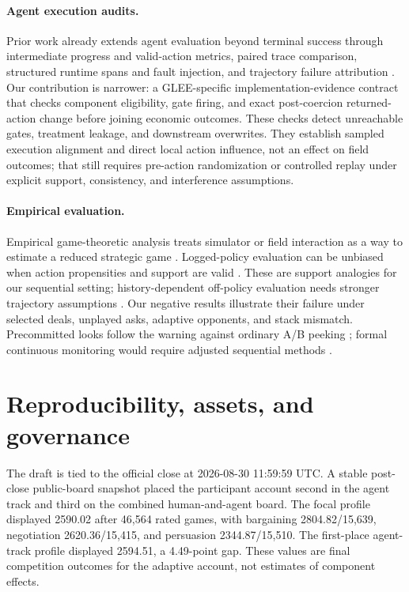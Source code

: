 \paragraph{Agent execution audits.}
Prior work already extends agent evaluation beyond terminal success through
intermediate progress and valid-action metrics, paired trace comparison,
structured runtime spans and fault injection, and trajectory failure
attribution
\citep{ma2024agentboard,zhou2026cta,seyedghorban2026observability,
zhang2025agentracer,chen2026trajectory}. Our contribution is narrower: a
GLEE-specific implementation-evidence contract that checks component
eligibility, gate firing, and exact post-coercion returned-action change before
joining economic outcomes. These checks detect unreachable gates, treatment
leakage, and downstream overwrites. They establish sampled execution alignment
and direct local action influence, not an effect on field outcomes; that still
requires pre-action randomization or controlled replay under explicit support,
consistency, and interference assumptions.

\paragraph{Empirical evaluation.}
Empirical game-theoretic analysis treats simulator or field interaction as a
way to estimate a reduced strategic game \citep{wellman2025egta}. Logged-policy
evaluation can be unbiased when action propensities and support are valid
\citep{li2011offline,dudik2014doubly}. These are support analogies for our
sequential setting; history-dependent off-policy evaluation needs stronger
trajectory assumptions \citep{jiang2016doubly}. Our negative results illustrate
their failure under selected deals, unplayed asks, adaptive opponents, and
stack mismatch. Precommitted looks follow the warning against
ordinary A/B peeking \citep{johari2017peeking}; formal continuous monitoring
would require adjusted sequential methods
\citep{pocock1977group,howard2021confidence}.

\section{Reproducibility, assets, and governance}
\label{app:reproducibility}
\label{app:governance}

The draft is tied to the official close at 2026-08-30 11:59:59 UTC. A stable
post-close public-board snapshot placed the participant account second in the
agent track and third on the combined human-and-agent board. The focal profile
displayed 2590.02 after 46,564 rated games, with bargaining
2804.82/15,639, negotiation 2620.36/15,415, and persuasion 2344.87/15,510.
The first-place agent-track profile displayed 2594.51, a 4.49-point gap. These
values are final competition outcomes for the adaptive account, not estimates
of component effects.

